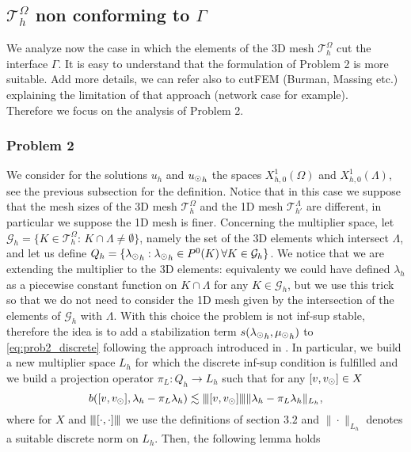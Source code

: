\def\patch{\omega _j}
\subsection{$\mathcal{T}^{\Omega}_h$ non conforming to $\Gamma$}
We analyze now the case in which the elements of the 3D mesh $\mathcal{T}^{\Omega}_h$ cut the interface $\Gamma$. It is easy to understand that the formulation of Problem 2 is more suitable. 
{\color{red} Add more details, we can refer also to cutFEM (Burman, Massing etc.) explaining the limitation of that approach (network case for example).}\\
Therefore we focus on the analysis of Problem 2.

\subsubsection{Problem 2} We consider for the solutions $u_h$ and ${u_{\odot}}_h$ the spaces $X_{h,0}^1(\Omega)$ and $X_{h,0}^1(\Lambda)$, see the previous subsection for the definition. Notice that in this case we suppose that the mesh sizes of the 3D mesh $\mathcal{T}^{\Omega}_h$ and the 1D mesh $\mathcal{T}^{\Lambda}_{h'}$ are different, in particular we suppose the 1D mesh is finer. Concerning the multiplier space, let $\mathcal{G}_h = \{K \in \mathcal{T}^{\Omega}_h: \, K\cap \Lambda \neq \emptyset\}$, namely the set of the 3D elements which intersect $\Lambda$, and let us define $Q_h=\{{\lambda_{\odot}}_h : {\lambda_{\odot}}_h \in P^0(K) \, \forall K \in \mathcal{G}_h\}$. We notice that we are extending the multiplier to the 3D elements: equivalenty we could have defined $\lambda_h$ as a piecewise constant function on $K\cap \Lambda$ for any $K \in \mathcal{G}_h$, but we use this trick so that we do not need to consider the 1D mesh given by the intersection of the elements of $\mathcal{G}_h$ with $\Lambda$. With this choice the problem is not inf-sup stable, therefore the idea is to add a stabilization term $s({\lambda_{\odot}}_h, {\mu_{\odot}}_h)$ to \eqref{eq:prob2_discrete} following the approach introduced in \cite{burman2014}. In particular, we build a new multiplier space $L_h$ for which the discrete inf-sup condition is fulfilled and we build a projection operator $\pi_L: Q_h \rightarrow L_h$ such that for any $[v, v_{\odot}] \in X $
\begin{equation}\label{condition_pi_L}
b([v, \vd], \lambda_h - \pi_L \lambda_h) \lesssim \vertiii{[v,\vd]}\|\lambda_h - \pi_L \lambda_h\|_{L_h},
\end{equation}
where for $X$ and ${\left\vert\kern-0.25ex\left\vert\kern-0.25ex\left\vert [\cdot, \cdot] \right\vert\kern-0.25ex\right\vert\kern-0.25ex\right\vert}$ we use the definitions of section $3.2$ and $\|\cdot \|_{L_h}$ denotes a suitable discrete norm on $L_h$. Then, the following lemma holds
